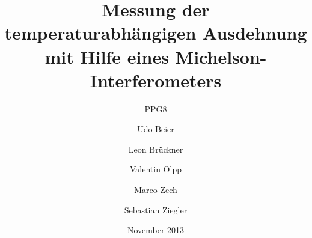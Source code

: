 


\title{Messung der temperaturabhängigen Ausdehnung mit Hilfe eines Michelson-Interferometers}
\subtitle{PPG8}
\date{November 2013}
\author{Udo Beier \and Leon Brückner \and Valentin Olpp \and Marco Zech \and Sebastian Ziegler}
\maketitle
\tableofcontents
\listoffigures
\newpage




\newpage




